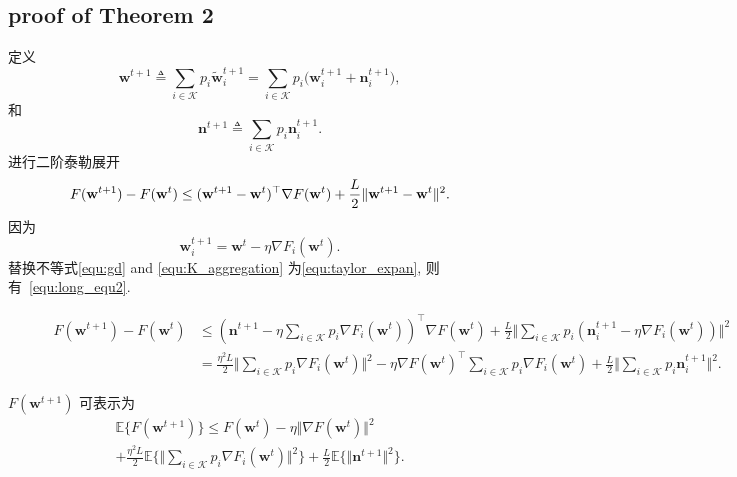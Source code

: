 \subsection{proof of Theorem 2} \label{appendix:ConvforK}
定义
\begin{equation}\label{equ:K_aggregation}
\mathbf{w}^{t+1} \triangleq \sum_{i \in \mathcal{K}}{p_{i}\widetilde{\mathbf{w}}_{i}^{t+1}}=\sum_{i \in \mathcal{K}}{p_{i}(\mathbf{w}_{i}^{t+1}}+\mathbf{n}^{t+1}_{i}),
\end{equation}
和
\begin{equation}
\mathbf{n}^{t+1} \triangleq \sum_{i \in \mathcal{K}}p_{i}\mathbf{n}^{t+1}_{i}.
\end{equation}
进行二阶泰勒展开
\begin{equation}\label{equ:taylor_expan}
F(\mathbf{w}^{t+1})-F(\mathbf{w}^{t})\leq (\mathbf{w}^{t+1}-\mathbf{w}^{t})^{\top}\nabla F(\mathbf{w}^{t})\\
+\frac{L}{2}\Vert \mathbf{w}^{t+1}-\mathbf{w}^{t}\Vert^{2}.
\end{equation}
因为
\begin{equation}\label{equ:gd}
\mathbf{w}_{i}^{t+1}=\mathbf{w}^{t}-\eta \nabla F_{i}(\mathbf{w}^{t}).
\end{equation}
替换不等式\eqref{equ:gd} and  \eqref{equ:K_aggregation}  为\eqref{equ:taylor_expan}, 则有~\eqref{equ:long_equ2}.
\begin{figure}[ht]
\normalsize
\begin{equation}\label{equ:long_equ2}
\begin{aligned}
F(\mathbf{w}^{t+1})- F(\mathbf{w}^{t})&\leq \left(\mathbf{n}^{t+1}-\eta\sum_{i\in \mathcal{K}}{p_{i}\nabla F_{i}(\mathbf{w}^{t})}\right)^{\top}\nabla F(\mathbf{w}^{t})+\frac{L}{2}\Vert \sum_{i\in \mathcal{K}}{p_{i}(\mathbf{n}_{i}^{t+1}-\eta\nabla F_{i}(\mathbf{w}^{t}))}\Vert^{2}\\
&=\frac{\eta^2L}{2}\Vert \sum_{i\in \mathcal{K}}{p_{i}\nabla F_{i}(\mathbf{w}^{t})}\Vert^{2}-
\eta\nabla F(\mathbf{w}^{t})^{\top}\sum_{i\in \mathcal{K}}{p_{i}\nabla F_{i}(\mathbf{w}^{t})}
+\frac{L}{2}\Vert\sum_{i\in \mathcal{K}}p_{i}\mathbf{n}_{i}^{t+1}\Vert^2.
\end{aligned}
\end{equation}
\hrulefill
\end{figure}
 $F(\mathbf{w}^{t+1})$  可表示为
\begin{multline}\label{equ:exp_obj}
\mathbb{E}\{F(\mathbf{w}^{t+1})\}\leq F(\mathbf{w}^{t})-\eta\Vert \nabla F(\mathbf{w}^{t})\Vert^{2}\\
+\frac{\eta^2L}{2}\mathbb{E}\{\Vert \sum_{i\in \mathcal{K}}{p_{i}\nabla F_{i}(\mathbf{w}^{t})}\Vert^{2}\}
+\frac{L}{2}\mathbb{E}\{\Vert\mathbf{n}^{t+1}\Vert^2\}.
\end{multline}

